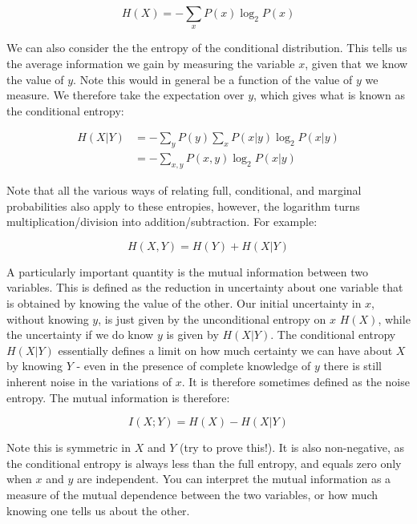 \documentclass{article}
\begin{document}
\begin{equation*}
    H(X) = -\sum_x P(x) \log_2P(x)
\end{equation*}

We can also consider the the entropy of the conditional distribution. This tells us the average information we gain by measuring the variable $x$, given that we know the value of $y$. Note this would in general be a function of the value of $y$ we measure. We therefore take the expectation over $y$, which gives what is known as the conditional entropy:

\begin{align*}
    H(X|Y) &= -\sum_{y} P(y) \sum_x P(x|y) \log_2P(x|y)\\
    &= -\sum_{x,y} P(x,y) \log_2P(x|y)
\end{align*}

Note that all the various ways of relating full, conditional, and marginal probabilities also apply to these entropies, however, the logarithm turns multiplication/division into addition/subtraction. For example:

\begin{equation*}
    H(X,Y) = H(Y) + H(X|Y)
\end{equation*}

A particularly important quantity is the mutual information between two variables. This is defined as the reduction in uncertainty about one variable that is obtained by knowing the value of the other. Our initial uncertainty in $x$, without knowing $y$, is just given by the unconditional entropy on $x$ $H(X)$, while the uncertainty if we do know $y$ is given by $H(X|Y)$. The conditional entropy $H(X|Y)$ essentially defines a limit on how much certainty we can have about $X$ by knowing $Y$ - even in the presence of complete knowledge of $y$ there is still inherent noise in the variations of $x$. It is therefore sometimes defined as the noise entropy. The mutual information is therefore:

\begin{equation*}
    I(X;Y) = H(X) - H(X|Y)
\end{equation*}

Note this is symmetric in $X$ and $Y$ (try to prove this!). It is also non-negative, as the conditional entropy is always less than the full entropy, and equals zero only when $x$ and $y$ are independent. You can interpret the mutual information as a measure of the mutual dependence between the two variables, or how much knowing one tells us about the other.\\
\end{document}
